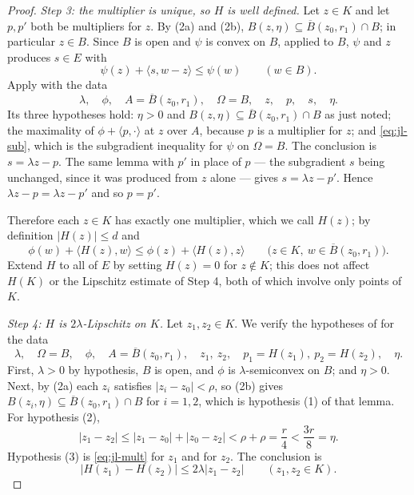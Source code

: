 \begin{proof}
\emph{Step 3: the multiplier is unique, so $H$ is well defined.}
Let $z\in K$ and let $p,p'$ both be multipliers for $z$. By (2a) and (2b),
$B(z,\eta)\subseteq\overline B(z_0,r_1)\cap B$; in particular $z\in B$. Since
$B$ is open and $\psi$ is convex on $B$, 
applied to $B$, $\psi$ and $z$ produces $s\in E$ with
\begin{equation}\label{eq:jl-sub}
  \psi(z)+\langle s,w-z\rangle\le\psi(w)\qquad(w\in B).
\end{equation}
Apply  with the data
\[
  \lambda,\quad\phi,\quad A=\overline B(z_0,r_1),\quad\Omega=B,\quad
  z,\quad p,\quad s,\quad\eta .
\]
Its three hypotheses hold: $\eta>0$ and
$B(z,\eta)\subseteq\overline B(z_0,r_1)\cap B$ as just noted; the maximality of
$\phi+\langle p,\cdot\rangle$ at $z$ over $A$, because $p$ is a multiplier for
$z$; and \eqref{eq:jl-sub}, which is the subgradient inequality for $\psi$ on
$\Omega=B$. The conclusion is $s=\lambda z-p$. The same lemma with $p'$ in place
of $p$ --- the subgradient $s$ being unchanged, since it was produced from $z$
alone --- gives $s=\lambda z-p'$. Hence $\lambda z-p=\lambda z-p'$ and so
$p=p'$.

Therefore each $z\in K$ has exactly one multiplier, which we call $H(z)$; by
definition $|H(z)|\le d$ and
\begin{equation}\label{eq:jl-mult}
  \phi(w)+\langle H(z),w\rangle\le\phi(z)+\langle H(z),z\rangle
  \qquad\bigl(z\in K,\ w\in\overline B(z_0,r_1)\bigr).
\end{equation}
Extend $H$ to all of $E$ by setting $H(z)=0$ for $z\notin K$; this does not
affect $H(K)$ or the Lipschitz estimate of Step 4, both of which involve only
points of $K$.

\emph{Step 4: $H$ is $2\lambda$-Lipschitz on $K$.}
Let $z_1,z_2\in K$. We verify the hypotheses of
 for the data
\[
  \lambda,\quad\Omega=B,\quad\phi,\quad A=\overline B(z_0,r_1),\quad
  z_1,\ z_2,\quad p_1=H(z_1),\ p_2=H(z_2),\quad\eta .
\]
First, $\lambda>0$ by hypothesis, $B$ is open, and $\phi$ is
$\lambda$-semiconvex on $B$; and $\eta>0$. Next, by (2a) each $z_i$ satisfies
$|z_i-z_0|<\rho$, so (2b) gives
$B(z_i,\eta)\subseteq\overline B(z_0,r_1)\cap B$ for $i=1,2$, which is
hypothesis (1) of that lemma. For hypothesis (2),
\[
  |z_1-z_2|\le|z_1-z_0|+|z_0-z_2|<\rho+\rho=\frac r4<\frac{3r}{8}=\eta .
\]
Hypothesis (3) is \eqref{eq:jl-mult} for $z_1$ and for $z_2$. The conclusion is
\begin{equation}\label{eq:jl-lip}
  |H(z_1)-H(z_2)|\le2\lambda|z_1-z_2|\qquad(z_1,z_2\in K).
\end{equation}


\end{proof}
